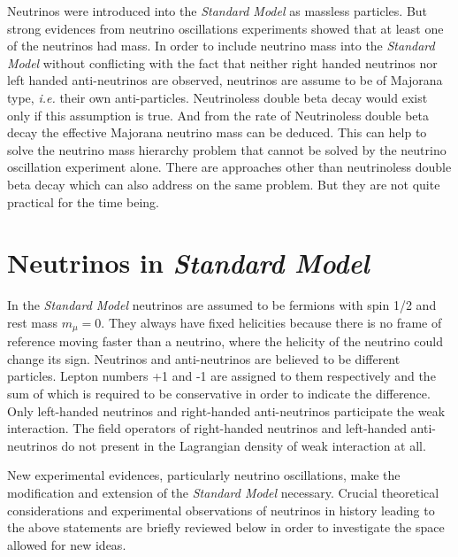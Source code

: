Neutrinos were introduced into the \emph{Standard Model} as massless
particles. But strong evidences from neutrino oscillations experiments
showed that at least one of the neutrinos had mass. In order to
include neutrino mass into the \emph{Standard Model} without
conflicting with the fact that neither right handed neutrinos nor left
handed anti-neutrinos are observed, neutrinos are assume to be of
Majorana type, \textit{i.e.} their own anti-particles. Neutrinoless
double beta decay would exist only if this assumption is true. And
from the rate of Neutrinoless double beta decay the effective Majorana
neutrino mass can be deduced. This can help to solve the neutrino mass
hierarchy problem that cannot be solved by the neutrino oscillation
experiment alone. There are approaches other than neutrinoless double
beta decay which can also address on the same problem. But they are
not quite practical for the time being.

\section{Neutrinos in \emph{Standard Model}}
\label{sec:sm}
In the \emph{Standard Model} neutrinos are assumed to be fermions with
spin 1/2 and rest mass $m_\mu=0$. They always have fixed helicities
because there is no frame of reference moving faster than a neutrino,
where the helicity of the neutrino could change its sign. Neutrinos
and anti-neutrinos are believed to be different particles. Lepton
numbers +1 and -1 are assigned to them respectively and the sum of
which is required to be conservative in order to indicate the
difference. Only left-handed neutrinos and right-handed anti-neutrinos
participate the weak interaction. The field operators of right-handed
neutrinos and left-handed anti-neutrinos do not present in the
Lagrangian density of weak interaction at all.

New experimental evidences, particularly neutrino oscillations, make
the modification and extension of the \emph{Standard Model} necessary.
Crucial theoretical considerations and experimental observations of
neutrinos in history leading to the above statements are briefly
reviewed below in order to investigate the space allowed for new
ideas.

